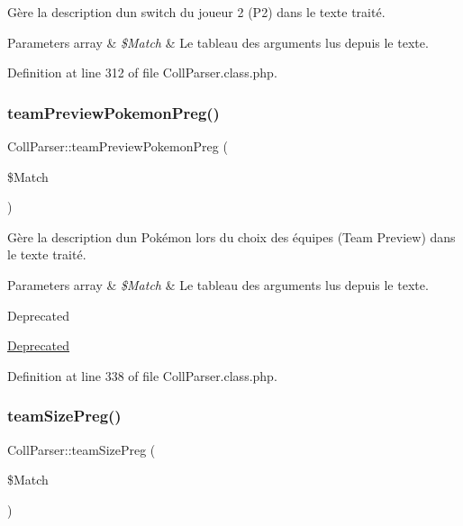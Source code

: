 Gère la description d\textquotesingle{}un switch du joueur 2 (P2) dans le texte traité.


\begin{DoxyParams}[1]{Parameters}
array & {\em \$\+Match} & Le tableau des arguments lus depuis le texte. \\
\hline
\end{DoxyParams}


Definition at line 312 of file Coll\+Parser.\+class.\+php.

\mbox{\label{class_coll_parser_a0adee1fa910879cf58ba3914563a7c80}} 
\subsubsection{\texorpdfstring{team\+Preview\+Pokemon\+Preg()}{teamPreviewPokemonPreg()}}
{\footnotesize\ttfamily Coll\+Parser\+::team\+Preview\+Pokemon\+Preg (\begin{DoxyParamCaption}\item[{}]{\$\+Match }\end{DoxyParamCaption})\hspace{0.3cm}{\ttfamily [protected]}}

Gère la description d\textquotesingle{}un Pokémon lors du choix des équipes (Team Preview) dans le texte traité.


\begin{DoxyParams}[1]{Parameters}
array & {\em \$\+Match} & Le tableau des arguments lus depuis le texte. \\
\hline
\end{DoxyParams}
\begin{DoxyRefDesc}{Deprecated}
\item[\hyperlink{deprecated__deprecated000016}{Deprecated}]\end{DoxyRefDesc}


Definition at line 338 of file Coll\+Parser.\+class.\+php.

\mbox{\label{class_coll_parser_aecd19071144d47fe4a75030de343bf5a}} 
\subsubsection{\texorpdfstring{team\+Size\+Preg()}{teamSizePreg()}}
{\footnotesize\ttfamily Coll\+Parser\+::team\+Size\+Preg (\begin{DoxyParamCaption}\item[{}]{\$\+Match }\end{DoxyParamCaption})\hspace{0.3cm}{\ttfamily [protected]}}

